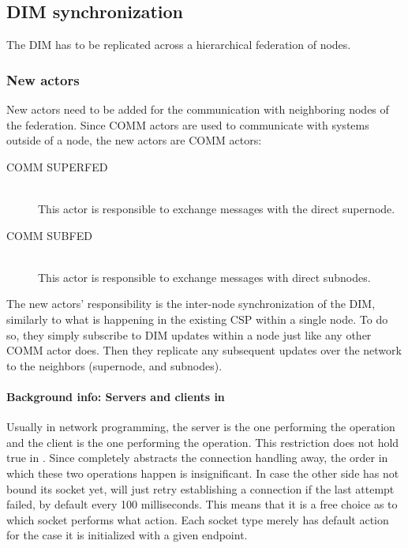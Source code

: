 \subsection{DIM synchronization}
The DIM has to be replicated across a hierarchical federation of nodes.

\subsubsection{New actors}
New actors need to be added for the communication with neighboring nodes of the
federation.  Since COMM actors are used to communicate with systems outside of
a node, the new actors are COMM actors:

\begin{description}
	\item [COMM SUPERFED]\hfill\\
		This actor is responsible to exchange \zmq messages with the
		direct supernode.

	\item [COMM SUBFED]\hfill\\
		This actor is responsible to exchange \zmq messages with direct
		subnodes.
\end{description}

The new actors' responsibility is the inter-node synchronization of the DIM,
similarly to what is happening in the existing \gls{CSP} within a single node.
To do so, they simply subscribe to DIM updates within a node just like any
other COMM actor does.  Then they replicate any subsequent updates over the network
to the neighbors (supernode, and subnodes).

\paragraph{Background info: Servers and clients in \zmq}
Usually in network programming, the server is the one performing the
 operation and the client is the one performing the 
operation. This restriction does not hold true in \zmq. Since \zmq completely
abstracts the connection handling away, the order in which these two operations
happen is insignificant. In case the other side has not bound its socket
yet, \zmq will just retry establishing a connection if the last attempt failed,
by default every 100 milliseconds. This means that it is a free choice as to which socket
performs what action. Each socket type merely has default action for the case
it is initialized with a given endpoint.

